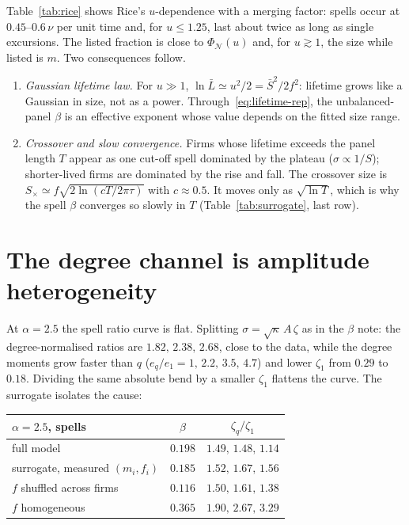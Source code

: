 \documentclass[11pt]{article}
\theoremstyle{remark}
\begin{document}
Table~\ref{tab:rice} shows Rice's $u$-dependence with a merging factor: spells occur at $0.45$--$0.6\,\nu$ per
unit time and, for $u\le1.25$, last about twice as long as single excursions.  The listed fraction is close to $\Phi_{\mathcal N}(u)$ and,
for $u\gtrsim1$, the size while listed is $m$.  Two consequences follow.
\begin{enumerate}
  \item \emph{Gaussian lifetime law.} For $u\gg1$, $\ln\bar L\simeq u^2/2=\bar S^2/2f^2$: lifetime grows like a
        Gaussian in size, not as a power.  Through~\eqref{eq:lifetime-rep}, the unbalanced-panel $\beta$ is an
        effective exponent whose value depends on the fitted size range.
  \item \emph{Crossover and slow convergence.} Firms whose lifetime exceeds the panel length $T$ appear as one
        cut-off spell dominated by the plateau ($\sigma\propto1/S$); shorter-lived firms are dominated by the
        rise and fall.  The crossover size is $S_\times\simeq f\sqrt{2\ln(cT/2\pi\tau)}$ with $c\approx0.5$.  It
        moves only as $\sqrt{\ln T}$, which is why the spell $\beta$ converges so slowly in $T$
        (Table~\ref{tab:surrogate}, last row).
\end{enumerate}

\section{The degree channel is amplitude heterogeneity}

At $\alpha=2.5$ the spell ratio curve is flat.  Splitting $\sigma=\sqrt\kappa\,A\,\zeta$ as in the $\beta$ note:
the degree-normalised ratios are $1.82,\,2.38,\,2.68$, close to the data, while the degree moments grow faster
than $q$ ($e_q/e_1=1,\,2.2,\,3.5,\,4.7$) and lower $\zeta_1$ from $0.29$ to $0.18$.  Dividing the same absolute
bend by a smaller $\zeta_1$ flattens the curve.  The surrogate isolates the cause:

\begin{center}
\small
\begin{tabular}{lcc}
\toprule
$\alpha=2.5$, spells & $\beta$ & $\zeta_q/\zeta_1$\\
\midrule
full model & $0.198$ & $1.49,\,1.48,\,1.14$\\
surrogate, measured $(m_i,f_i)$ & $0.185$ & $1.52,\,1.67,\,1.56$\\
$f$ shuffled across firms & $0.116$ & $1.50,\,1.61,\,1.38$\\
$f$ homogeneous & $0.365$ & $1.90,\,2.67,\,3.29$\\
\bottomrule
\end{tabular}
\end{center}
\end{document}
